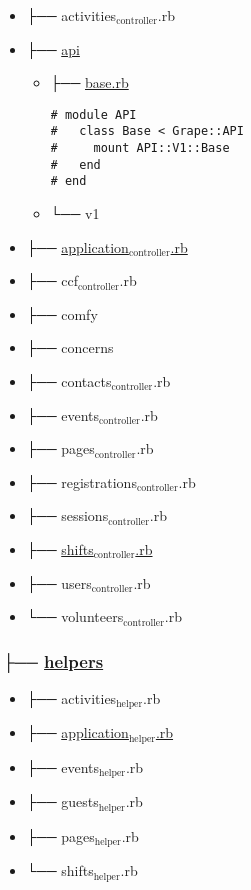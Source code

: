 \documentclass[11pt]{article}
\begin{document}
\begin{itemize}
\item ├── activities$_{\text{controller}}$.rb
\label{sec-1-1-3-1}
\item ├── \href{./app/controllers/api}{api}
\label{sec-1-1-3-2}

\begin{itemize}
\item ├── \href{./app/controllers/api/base.rb}{base.rb}
\label{sec-1-1-3-2-1}

\begin{verbatim}
# module API
#   class Base < Grape::API
#     mount API::V1::Base
#   end
# end
\end{verbatim}

\item └── v1
\label{sec-1-1-3-2-2}
\end{itemize}

\item ├── \href{./app/controllers/application_controller.rb}{application$_{\text{controller}}$.rb}
\label{sec-1-1-3-3}
\item ├── ccf$_{\text{controller}}$.rb
\label{sec-1-1-3-4}
\item ├── comfy
\label{sec-1-1-3-5}
\item ├── concerns
\label{sec-1-1-3-6}
\item ├── contacts$_{\text{controller}}$.rb
\label{sec-1-1-3-7}
\item ├── events$_{\text{controller}}$.rb
\label{sec-1-1-3-8}
\item ├── pages$_{\text{controller}}$.rb
\label{sec-1-1-3-9}
\item ├── registrations$_{\text{controller}}$.rb
\label{sec-1-1-3-10}
\item ├── sessions$_{\text{controller}}$.rb
\label{sec-1-1-3-11}
\item ├── \href{./app/controllers/shifts_controller.rb}{shifts$_{\text{controller}}$.rb}
\label{sec-1-1-3-12}
\item ├── users$_{\text{controller}}$.rb
\label{sec-1-1-3-13}
\item └── volunteers$_{\text{controller}}$.rb
\label{sec-1-1-3-14}
\end{itemize}

\subsubsection*{├── \href{./app/helpers}{helpers}}
\label{sec-1-1-4}

\begin{itemize}
\item ├── activities$_{\text{helper}}$.rb
\label{sec-1-1-4-1}
\item ├── \href{./app/helpers/application_helper.rb}{application$_{\text{helper}}$.rb}
\label{sec-1-1-4-2}
\item ├── events$_{\text{helper}}$.rb
\label{sec-1-1-4-3}
\item ├── guests$_{\text{helper}}$.rb
\label{sec-1-1-4-4}
\item ├── pages$_{\text{helper}}$.rb
\label{sec-1-1-4-5}
\item └── shifts$_{\text{helper}}$.rb
\label{sec-1-1-4-6}
\end{itemize}
\end{document}
